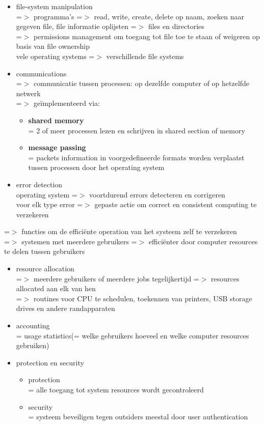 \documentclass{report}
\begin{document}
\begin{itemize}
\item file-system manipulation
\\=$>$ programma's =$>$ read, write, create, delete op naam, zoeken naar gegeven file, file informatie oplijsten =$>$ files en directories
\\=$>$ permissions management om toegang tot file toe te staan of weigeren op basis van file ownership 
\\vele operating systems =$>$ verschillende file systems
\item communications
\\=$>$ communicatie tussen processen: op dezelfde computer of op hetzelfde netwerk
\\=$>$ ge\"implementeerd via:
\begin{itemize}
\item \textbf{shared memory}
\\ = 2 of meer processen lezen en schrijven in shared section of memory
\item \textbf{message passing}
\\= packets information in voorgedefineerde formats worden verplaatst tussen processen door het operating system
\end{itemize}
\item error detection
\\ operating system =$>$ voortdurend errors detecteren en corrigeren
\\ voor elk type error =$>$ gepaste actie om correct en consistent computing te verzekeren
\end{itemize}
=$>$ functies om de effici\"ente operation van het systeem zelf te verzekeren
\\=$>$ systemen met meerdere gebruikers =$>$ effici\"enter door computer resources 
te delen tussen gebruikers
\begin{itemize}
\item resource allocation
\\=$>$ meerdere gebruikers of meerdere jobs tegelijkertijd =$>$ resources allocated aan elk van hen
\\=$>$ routines voor CPU te schedulen, toekennen van printers, USB storage drives en andere randapparaten
\item accounting
\\= usage statistics(= welke gebruikers hoeveel en welke computer resources gebruiken)
\item protection en security
\begin{itemize}
\item protection
\\= alle toegang tot system resources wordt gecontroleerd
\item security
\\= systeem beveiligen tegen outsiders meestal door user authentication
\end{itemize}
\end{itemize}
\end{document}

